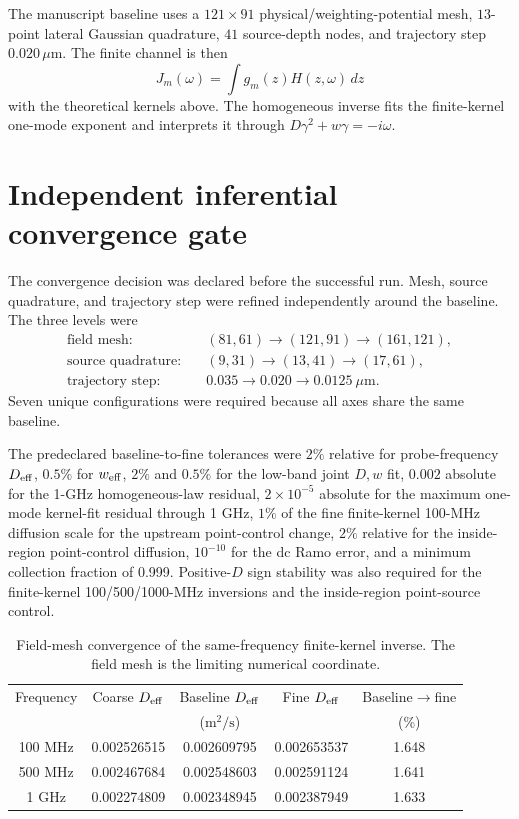 \documentclass[aps,pra,onecolumn,superscriptaddress,nofootinbib]{revtex4-2}
\begin{document}
The manuscript baseline uses a $121\times91$ physical/weighting-potential mesh, $13$-point lateral Gaussian quadrature, $41$ source-depth nodes, and trajectory step $0.020\,\mu\mathrm{m}$.  The finite channel is then
\begin{equation}
J_m(\omega)=\int g_m(z)H(z,\omega)\,dz
\end{equation}
with the theoretical kernels above.  The homogeneous inverse fits the finite-kernel one-mode exponent and interprets it through $D\gamma^2+w\gamma=-i\omega$.

\section{Independent inferential convergence gate}

The convergence decision was declared before the successful run.  Mesh, source quadrature, and trajectory step were refined independently around the baseline.  The three levels were
\begin{align*}
\text{field mesh:}\quad &(81,61)\rightarrow(121,91)\rightarrow(161,121),\\
\text{source quadrature:}\quad &(9,31)\rightarrow(13,41)\rightarrow(17,61),\\
\text{trajectory step:}\quad &0.035\rightarrow0.020\rightarrow0.0125\ \mu\mathrm{m}.
\end{align*}
Seven unique configurations were required because all axes share the same baseline.

The predeclared baseline-to-fine tolerances were $2\%$ relative for probe-frequency $D_{\rm eff}$, $0.5\%$ for $w_{\rm eff}$, $2\%$ and $0.5\%$ for the low-band joint $D,w$ fit, $0.002$ absolute for the 1-GHz homogeneous-law residual, $2\times10^{-5}$ absolute for the maximum one-mode kernel-fit residual through 1 GHz, $1\%$ of the fine finite-kernel 100-MHz diffusion scale for the upstream point-control change, $2\%$ relative for the inside-region point-control diffusion, $10^{-10}$ for the dc Ramo error, and a minimum collection fraction of 0.999.  Positive-$D$ sign stability was also required for the finite-kernel 100/500/1000-MHz inversions and the inside-region point-source control.

\begin{table}[h]
\caption{Field-mesh convergence of the same-frequency finite-kernel inverse.  The field mesh is the limiting numerical coordinate.}
\centering
\begin{tabular}{ccccc}
\toprule
Frequency & Coarse $D_{\rm eff}$ & Baseline $D_{\rm eff}$ & Fine $D_{\rm eff}$ & Baseline$\to$fine\\
 & \multicolumn{3}{c}{($\mathrm{m^2/s}$)} & (\%)\\
\midrule
100 MHz & 0.002526515 & 0.002609795 & 0.002653537 & 1.648\\
500 MHz & 0.002467684 & 0.002548603 & 0.002591124 & 1.641\\
1 GHz   & 0.002274809 & 0.002348945 & 0.002387949 & 1.633\\
\bottomrule
\end{tabular}
\end{table}
\end{document}
